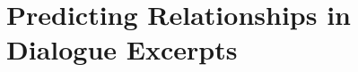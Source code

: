 \documentclass[11pt, oneside]{book}
\begin{document}
\chapter[PRIDE]{Predicting Relationships in Dialogue Excerpts}



















\end{document}
